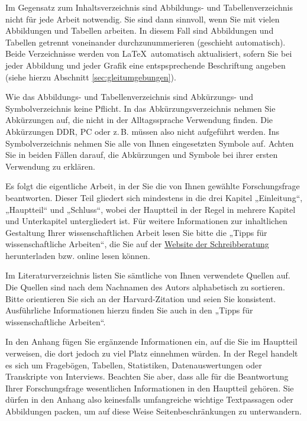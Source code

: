 \documentclass{scrbook}
\begin{document}
Im Gegensatz zum Inhaltsverzeichnis sind  Abbildungs- und Tabellenverzeichnis nicht für jede Arbeit notwendig. Sie sind dann sinnvoll, wenn Sie mit vielen Abbildungen und Tabellen arbeiten. In diesem Fall sind Abbildungen und Tabellen getrennt voneinander durchzunummerieren (geschieht automatisch). Beide Verzeichnisse werden von \LaTeX\ automatisch aktualisiert, sofern Sie bei jeder Abbildung und jeder Grafik eine entspsprechende Beschriftung angeben (siehe hierzu Abschnitt \ref{sec:gleitumgebungen}).

Wie das Abbildungs- und Tabellenverzeichnis sind Abkürzungs- und Symbolverzeichnis keine Pflicht. In das Abkürzungsverzeichnis nehmen Sie Abkürzungen auf, die nicht in der Alltagssprache Verwendung finden. Die Abkürzungen DDR, PC oder z.\,B. müssen also nicht aufgeführt werden. Ins Symbolverzeichnis nehmen Sie alle von Ihnen eingesetzten Symbole auf. Achten Sie in beiden Fällen darauf, die Abkürzungen und Symbole bei ihrer ersten Verwendung zu erklären. 


Es folgt die eigentliche Arbeit, in der Sie die von Ihnen gewählte Forschungs\-frage beantworten. Dieser Teil gliedert sich mindestens in die drei Kapitel „Einleitung“, „Hauptteil“ und „Schluss“, wobei der Hauptteil in der Regel in mehrere Kapitel und Unterkapitel untergliedert ist. Für weitere Informationen zur inhaltlichen Gestaltung Ihrer wissenschaftlichen Arbeit lesen Sie bitte die „Tipps für wissenschaftliche Arbeiten“, die Sie auf der \href{https://www.vwl.uni-mannheim.de/studium/bachelorstudium/schreibberatung/weiterfuehrendes-material-und-vorlagen/}{\color{blue} Website der Schreibberatung} herunterladen bzw. online lesen können.

Im Literaturverzeichnis listen Sie sämtliche von Ihnen verwendete Quellen auf. Die Quellen sind nach dem Nachnamen des Autors alphabetisch zu sortieren. Bitte orientieren Sie sich an der Harvard-Zitation und seien Sie konsistent. Ausführliche Informationen hierzu finden Sie auch in den „Tipps für wissenschaftliche Arbeiten“.

In den Anhang fügen Sie ergänzende Informationen ein, auf die Sie im Hauptteil verweisen, die dort jedoch zu viel Platz einnehmen würden. In der Regel handelt es sich um Fragebögen, Tabellen, Statistiken, Datenauswertungen oder Transkripte von Interviews. Beachten Sie aber, dass alle für die Beantwortung Ihrer Forschungsfrage wesentlichen Informationen in den Hauptteil gehören. Sie dürfen in den Anhang also keinesfalls umfangreiche wichtige Textpassagen oder Abbildungen packen, um auf diese Weise Seitenbeschränkungen zu unterwandern.
\end{document}
